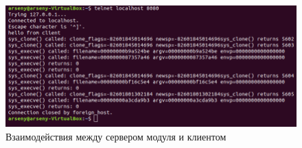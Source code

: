 \begin{figure}[h!]
	\centering
	\includegraphics[width=1.0\textwidth]{img/res3}
	\caption{Взаимодействия между сервером модуля и клиентом}
	\label{res3}
\end{figure}



